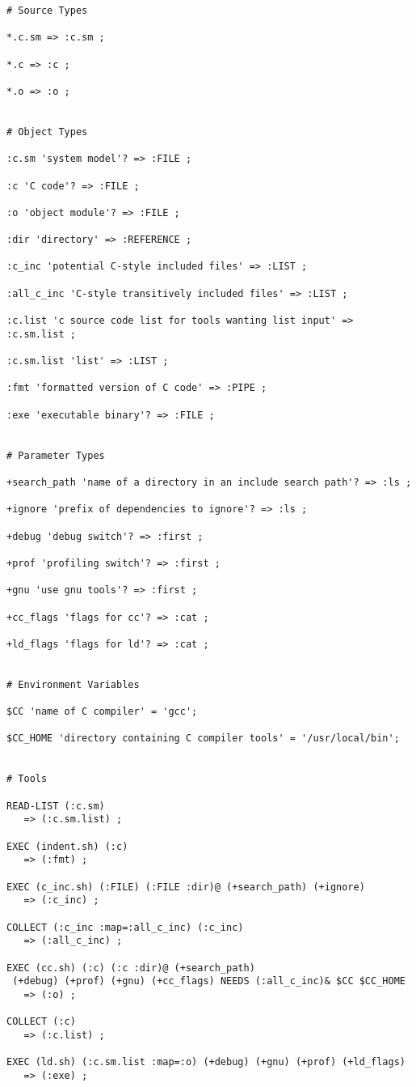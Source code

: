 \begin{verbatim}
# Source Types

*.c.sm => :c.sm ;

*.c => :c ;

*.o => :o ;


# Object Types

:c.sm 'system model'? => :FILE ;

:c 'C code'? => :FILE ;

:o 'object module'? => :FILE ;

:dir 'directory' => :REFERENCE ;

:c_inc 'potential C-style included files' => :LIST ;

:all_c_inc 'C-style transitively included files' => :LIST ;

:c.list 'c source code list for tools wanting list input' => :c.sm.list ;

:c.sm.list 'list' => :LIST ;

:fmt 'formatted version of C code' => :PIPE ;

:exe 'executable binary'? => :FILE ;


# Parameter Types

+search_path 'name of a directory in an include search path'? => :ls ;

+ignore 'prefix of dependencies to ignore'? => :ls ;

+debug 'debug switch'? => :first ;

+prof 'profiling switch'? => :first ;

+gnu 'use gnu tools'? => :first ;

+cc_flags 'flags for cc'? => :cat ;

+ld_flags 'flags for ld'? => :cat ;


# Environment Variables

$CC 'name of C compiler' = 'gcc';

$CC_HOME 'directory containing C compiler tools' = '/usr/local/bin';


# Tools

READ-LIST (:c.sm)
   => (:c.sm.list) ;

EXEC (indent.sh) (:c)
   => (:fmt) ;
 
EXEC (c_inc.sh) (:FILE) (:FILE :dir)@ (+search_path) (+ignore)
   => (:c_inc) ;

COLLECT (:c_inc :map=:all_c_inc) (:c_inc)
   => (:all_c_inc) ;

EXEC (cc.sh) (:c) (:c :dir)@ (+search_path)
 (+debug) (+prof) (+gnu) (+cc_flags) NEEDS (:all_c_inc)& $CC $CC_HOME
   => (:o) ;

COLLECT (:c)
   => (:c.list) ;

EXEC (ld.sh) (:c.sm.list :map=:o) (+debug) (+gnu) (+prof) (+ld_flags)
   => (:exe) ;
\end{verbatim}





